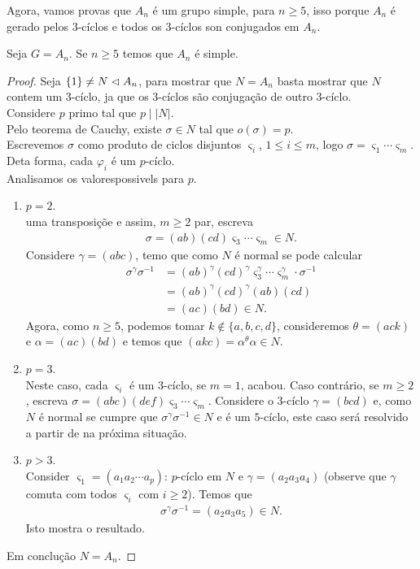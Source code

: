 Agora, vamos provas que $A_n$ é um grupo simple, para $n\geq 5$, isso porque $A_n$ é gerado pelos $3$-cíclos e todos os $3$-cíclos son conjugados em $A_n$.
\begin{theorem}[$A_n$ é simple]
  Seja $G=A_n$. Se $n\geq 5$ temos que $A_n$ é simple. 
\end{theorem}
\begin{proof} 
  Seja $\{1\}\neq N\vartriangleleft A_n$, para mostrar que $N=A_n$ basta mostrar que $N$ contem um $3$-cíclo, ja que os $3$-cíclos são conjugação de outro $3$-cíclo.\\
  Considere $p$ primo tal que $p\mid |N|$.\\
  Pelo teorema de Cauchy, existe $\sigma\in N$ tal que $o(\sigma)=p$.\\
  Escrevemos $\sigma$ como produto de ciclos disjuntos $\varsigma_i$, $1\leq i\leq m$, logo $\sigma=\varsigma_1\cdots\varsigma_m$.\\
  Deta forma, cada $\varphi_i$ é um $p$-cíclo.\\
  Analisamos os valorespossivels para $p$.
  \begin{enumerate}
    \item $p=2$.\\
      uma transposiçõe e assim, $m\geq 2$ par, escreva
      \begin{align*}
        \sigma=(ab)(cd)\varsigma_3\cdots\varsigma_m\in N.
      \end{align*}
      Considere $\gamma=(abc)$, temo que como $N$ é normal se pode calcular
      \begin{align*}
        \sigma^{\gamma}\sigma^{-1}&=(ab)^{\gamma}(cd)^{\gamma}\varsigma_3^{\gamma}\cdots\varsigma_{m}^{\gamma}\cdot \sigma^{-1}\\
        &=(ab)^{\gamma}(cd)^{\gamma}(ab)(cd)\\
        &=(ac)(bd)\in N.
      \end{align*}
      Agora, como $n\geq 5$, podemos tomar $k\notin\{a,b,c,d\}$, consideremos $\theta=(ack)$ e $\alpha=(ac)(bd)$ e temos que $(akc)=\alpha^{\theta}\alpha\in N$.
    \item $p=3$.\\
      Neste caso, cada $\varsigma_i$ é um $3$-cíclo, se $m=1$, acabou. Caso contrário, se $m\geq 2$, escreva $\sigma=(abc)(def)\varsigma_3\cdots\varsigma_m$. Considere o $3$-cíclo $\gamma=(bcd)$ e, como $N$ é normal se cumpre que $\sigma^{\gamma}\sigma^{-1}\in N$ e é um $5$-cíclo, este caso será resolvido a partir de na próxima situação.
    \item $p>3$.\\
      Consider $\varsigma_1=(a_1a_2\cdots a_p)$: $p$-cíclo em $N$ e $\gamma=(a_2a_3a_4)$ (observe que $\gamma$ comuta com todos $\varsigma_i$ com $i\geq 2$). Temos que
      \begin{align*}
        \sigma^{\gamma}\sigma^{-1}=(a_2a_3a_5)\in N.
      \end{align*}
      Isto mostra o resultado.
  \end{enumerate}
  Em conclução $N=A_n$.
\end{proof}
